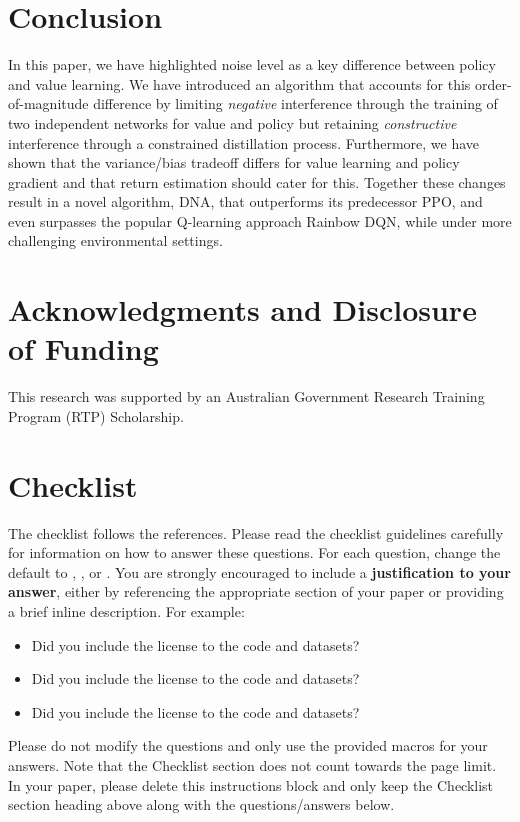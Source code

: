 \documentclass{article}
\newif\ifpreprint
\begin{document}
\section{Conclusion}



In this paper, we have highlighted noise level as a key difference between policy and value learning. We have introduced an algorithm that accounts for this order-of-magnitude difference by limiting \textit{negative} interference through the training of two independent networks for value and policy but retaining \textit{constructive} interference through a constrained distillation process. Furthermore, we have shown that the variance/bias tradeoff differs for value learning and policy gradient and that return estimation should cater for this. Together these changes result in a novel algorithm, DNA, that outperforms its predecessor PPO, and even surpasses the popular Q-learning approach Rainbow DQN, while under more challenging environmental settings.

\section*{Acknowledgments and Disclosure of Funding}
This research was supported by an Australian Government Research Training Program (RTP) Scholarship.

\newpage





\ifpreprint
\else

\section*{Checklist}

The checklist follows the references.  Please
read the checklist guidelines carefully for information on how to answer these
questions.  For each question, change the default \answerTODO{} to \answerYes{},
\answerNo{}, or \answerNA{}.  You are strongly encouraged to include a {\bf
justification to your answer}, either by referencing the appropriate section of
your paper or providing a brief inline description.  For example:
\begin{itemize}
  \item Did you include the license to the code and datasets? 
  \item Did you include the license to the code and datasets? 
  \item Did you include the license to the code and datasets? \answerNA{}
\end{itemize}
Please do not modify the questions and only use the provided macros for your
answers.  Note that the Checklist section does not count towards the page
limit.  In your paper, please delete this instructions block and only keep the
Checklist section heading above along with the questions/answers below.
\end{document}
